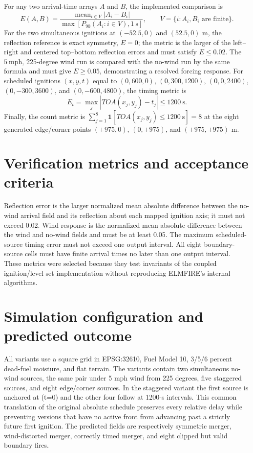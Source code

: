 For any two arrival-time arrays \(A\) and \(B\), the implemented comparison is
\[
 E(A,B)=\frac{\operatorname{mean}_{i\in V}|A_i-B_i|}
 {\max[P_{90}(A_i:i\in V),1~\mathrm{s}]},
 \qquad V=\{i:A_i,B_i\text{ are finite}\}.
\]
For the two simultaneous ignitions at \((-52.5,0)\) and \((52.5,0)\) m,
the reflection reference is exact symmetry, \(E=0\); the metric is the
larger of the left--right and centered top--bottom reflection errors and
must satisfy \(E\leq0.02\).  The \(5~\mathrm{mph}\), 225-degree wind run
is compared with the no-wind run by the same formula and must give
\(E\geq0.05\), demonstrating a resolved forcing response.
For scheduled ignitions \((x,y,t)\) equal to
\((0,600,0)\), \((0,300,1200)\), \((0,0,2400)\),
\((0,-300,3600)\), and \((0,-600,4800)\), the timing metric is
\[
 E_t=\max_j|TOA(x_j,y_j)-t_j|\leq1200~\mathrm{s}.
\]
Finally, the count metric is
\(\sum_{j=1}^{8}\mathbf{1}[TOA(x_j,y_j)\leq1200~\mathrm{s}]=8\) at the
eight generated edge/corner points \((\pm975,0)\), \((0,\pm975)\), and
\((\pm975,\pm975)\) m.

\section{Verification metrics and acceptance criteria}

Reflection error is the larger normalized mean absolute difference between the no-wind arrival field and its reflection about each mapped ignition axis; it must not exceed 0.02. Wind response is the normalized mean absolute difference between the wind and no-wind fields and must be at least 0.05. The maximum scheduled-source timing error must not exceed one output interval. All eight boundary-source cells must have finite arrival times no later than one output interval. These metrics were selected because they test invariants of the coupled ignition/level-set implementation without reproducing ELMFIRE's internal algorithms.

\section{Simulation configuration and predicted outcome}

All variants use a \GridSpacing{} square grid in EPSG:32610, Fuel Model 10, 3/5/6 percent dead-fuel moisture, and flat terrain. The variants contain two simultaneous no-wind sources, the same pair under 5 mph wind from 225 degrees, five staggered sources, and eight edge/corner sources. In the staggered variant the first source is anchored at (t=0) and the other four follow at 1200-s intervals. This common translation of the original absolute schedule preserves every relative delay while preventing versions that have no active front from advancing past a strictly future first ignition. The predicted fields are respectively symmetric merger, wind-distorted merger, correctly timed merger, and eight clipped but valid boundary fires.

